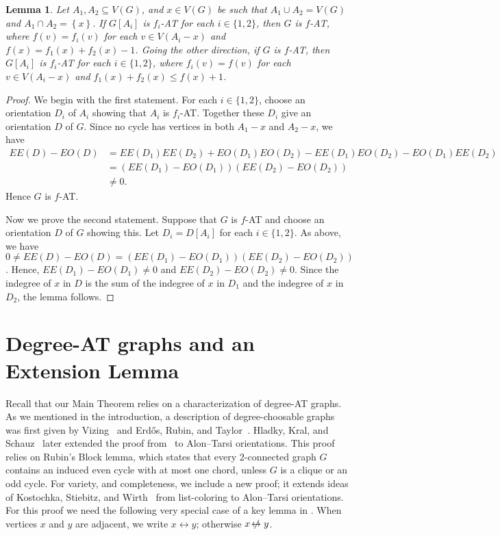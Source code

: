 \documentclass[12pt]{article}
\theoremstyle{plain}
\newtheorem{lem}[thm]{Lemma}
\theoremstyle{definition}
\theoremstyle{remark}
\newcommand{\set}[1]{\left\{ #1 \right\}}
\def\erdos{Erd\H{o}s}
\def\adj{\leftrightarrow}
\def\nonadj{\not\!\leftrightarrow}
\begin{document}
\begin{lem}\label{CutvertexPatch}
Let $A_1, A_2 \subseteq V(G)$, and $x\in V(G)$ be such that $A_1\cup A_2=V(G)$ and $A_1 \cap
A_2 = \set{x}$.  If $G[A_i]$ is $f_i$-AT for each $i \in \{1,2\}$, then $G$ is
$f$-AT, where $f(v) = f_i(v)$ for each $v \in V(A_i-x)$ and $f(x) = f_1(x) + f_2(x)
- 1$.  Going the other direction, if $G$ is $f$-AT, then $G[A_i]$ is $f_i$-AT
for each $i \in \{1,2\}$, where $f_i(v) = f(v)$ for each $v \in V(A_i-x)$ and
$f_1(x) + f_2(x) \le f(x) + 1$.
\end{lem}
\begin{proof}
We begin with the first statement.
For each $i \in \{1,2\}$, choose an orientation $D_i$ of $A_i$ showing that $A_i$
is $f_i$-AT.  Together these $D_i$ give an orientation $D$ of $G$. Since no cycle
has vertices in both $A_1-x$ and $A_2-x$, we have
\begin{align*}
EE(D) - EO(D) &= EE(D_1)EE(D_2) + EO(D_1)EO(D_2) - EE(D_1)EO(D_2) - EO(D_1)EE(D_2) \\
&= (EE(D_1) - EO(D_1))(EE(D_2) - EO(D_2)) \\
&\ne 0.
\end{align*}
Hence $G$ is $f$-AT.
	
Now we prove the second statement.  Suppose that $G$ is $f$-AT and choose an
orientation $D$ of $G$ showing this. 
Let $D_i = D[A_i]$ for each $i \in \{1,2\}$.  As above, we have $0 \ne
EE(D) - EO(D) = (EE(D_1) - EO(D_1))(EE(D_2) - EO(D_2))$. Hence, $EE(D_1) -
EO(D_1) \ne 0$ and $EE(D_2) - EO(D_2) \ne 0$.  Since the indegree of $x$ in
$D$ is the sum of the indegree of $x$ in $D_1$ and the indegree of $x$ in
$D_2$, the lemma follows.
\end{proof}

\section{Degree-AT graphs and an Extension Lemma}
Recall that our Main Theorem relies on a characterization of degree-AT graphs. 
As we mentioned in the introduction, a description of degree-choosable graphs
was first given by Vizing~\cite{vizing1976} and \erdos, Rubin, and
Taylor~\cite{ERT}.  Hladky, Kral, and Schauz~\cite{HKS} later extended the
proof from~\cite{ERT} to Alon--Tarsi orientations.  This proof relies on
Rubin's Block lemma, which states that every 2-connected graph $G$ contains an
induced even cycle with at most one chord, unless $G$ is a clique or an odd
cycle.  For variety, and completeness, we include a new proof; it extends ideas
of Kostochka, Stiebitz, and Wirth~\cite{KSW} from list-coloring to Alon--Tarsi
orientations.  For this proof we need the following very special case of a key
lemma in \cite{OreVizing}.  When vertices $x$ and $y$ are adjacent, we write
$x\adj y$; otherwise $x\nonadj y$.
\end{document}
